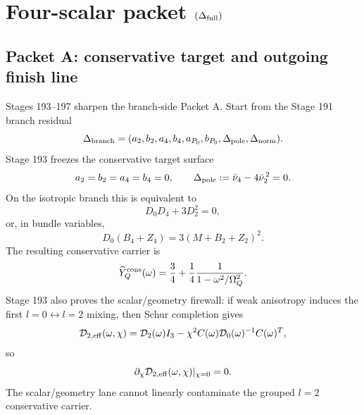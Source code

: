 
\section{Four-scalar packet \texorpdfstring{\((\Delta_{\rm full})\)}{(Deltafull)}}
\label{sec:app-part05_weak_axisymmetric_orbit:four-scalar-packet-delta-m-full}

\subsection{Packet A: conservative target and outgoing finish line}
Stages 193--197 sharpen the branch-side Packet A.  Start from the Stage 191 branch residual
\begin{equation}
\label{eq:app-part05-Delta-branch-full}
\Delta_{\rm branch}
=
(a_2,b_2,a_4,b_4,a_{P_0},b_{P_0},\Delta_{\rm pole},\Delta_{\rm norm}).
\end{equation}
Stage 193 freezes the conservative target surface
\begin{equation}
\label{eq:app-part05-conservative-target-surface}
a_2=b_2=a_4=b_4=0,
\qquad
\Delta_{\rm pole}:=\bar\nu_4-4\bar\nu_2^{\,2}=0.
\end{equation}
On the isotropic branch this is equivalent to
\begin{equation}
\label{eq:app-part05-one-pole-surface-D}
D_0D_4+3D_2^2=0,
\end{equation}
or, in bundle variables,
\begin{equation}
\label{eq:app-part05-one-pole-surface-bundle}
D_0(B_4+Z_4)=3(M+B_2+Z_2)^2.
\end{equation}
The resulting conservative carrier is
\begin{equation}
\label{eq:app-part05-conservative-one-pole-module}
\widehat Y_Q^{\rm cons}(\omega)
=
\frac34+\frac14\frac{1}{1-\omega^2/\Omega_Q^2}.
\end{equation}
Stage 193 also proves the scalar/geometry firewall: if weak anisotropy induces the first \(l=0\leftrightarrow l=2\) mixing, then Schur completion gives
\begin{equation}
\label{eq:app-part05-geometry-firewall-schur}
\mathcal D_{2,{\rm eff}}(\omega,\chi)
=
\mathcal D_2(\omega)I_3
-
\chi^2 C(\omega)\mathcal D_0(\omega)^{-1}C(\omega)^T,
\end{equation}
so
\begin{equation}
\label{eq:app-part05-geometry-firewall-result}
\partial_\chi\mathcal D_{2,{\rm eff}}(\omega,\chi)|_{\chi=0}=0.
\end{equation}
The scalar/geometry lane cannot linearly contaminate the grouped \(l=2\) conservative carrier.

